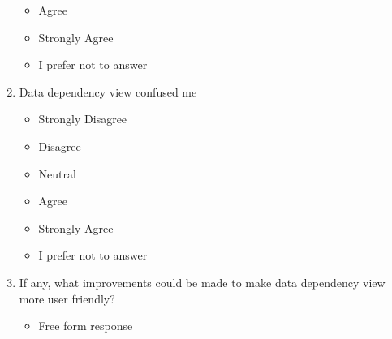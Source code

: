 \begin{enumerate}
\begin{itemize}
        \item Agree
        \item Strongly Agree
        \item I prefer not to answer
    \end{itemize}
    \item Data dependency view confused me
    \begin{itemize}
        \item Strongly Disagree
        \item Disagree
        \item Neutral
        \item Agree
        \item Strongly Agree
        \item I prefer not to answer
    \end{itemize}
    \item If any, what improvements could be made to make data dependency view more user friendly?
    \begin{itemize}
        \item Free form response
    \end{itemize}
\end{enumerate}